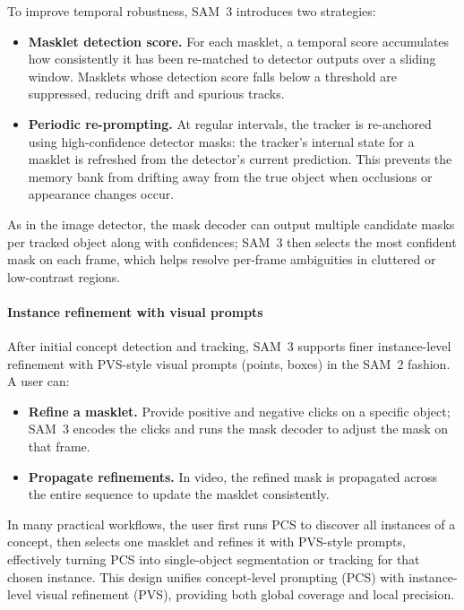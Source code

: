\begin{enrichment}
\begin{enrichment}
		To improve temporal robustness, SAM~3 introduces two strategies:
		\begin{itemize}
			\item \textbf{Masklet detection score.} For each masklet, a temporal score accumulates how consistently it has been re-matched to detector outputs over a sliding window. Masklets whose detection score falls below a threshold are suppressed, reducing drift and spurious tracks.
			\item \textbf{Periodic re-prompting.} At regular intervals, the tracker is re-anchored using high-confidence detector masks: the tracker’s internal state for a masklet is refreshed from the detector’s current prediction. This prevents the memory bank from drifting away from the true object when occlusions or appearance changes occur.
		\end{itemize}
		
		As in the image detector, the mask decoder can output multiple candidate masks per tracked object along with confidences; SAM~3 then selects the most confident mask on each frame, which helps resolve per-frame ambiguities in cluttered or low-contrast regions.
		
		\paragraph{Instance refinement with visual prompts}
		
		After initial concept detection and tracking, SAM~3 supports finer instance-level refinement with PVS-style visual prompts (points, boxes) in the SAM~2 fashion. A user can:
		\begin{itemize}
			\item \textbf{Refine a masklet.} Provide positive and negative clicks on a specific object; SAM~3 encodes the clicks and runs the mask decoder to adjust the mask on that frame.
			\item \textbf{Propagate refinements.} In video, the refined mask is propagated across the entire sequence to update the masklet consistently.
		\end{itemize}
		In many practical workflows, the user first runs PCS to discover all instances of a concept, then selects one masklet and refines it with PVS-style prompts, effectively turning PCS into single-object segmentation or tracking for that chosen instance. This design unifies concept-level prompting (PCS) with instance-level visual refinement (PVS), providing both global coverage and local precision.
		

\end{enrichment}
\end{enrichment}
